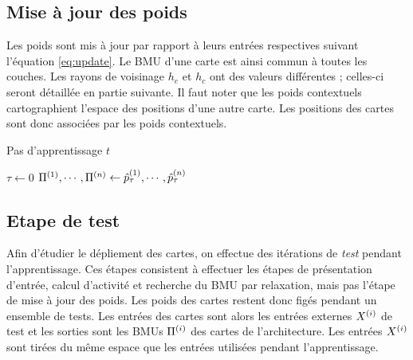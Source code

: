 \subsection{Mise à jour des poids}

Les poids sont mis à jour par rapport à leurs entrées respectives suivant l'équation \ref{eq:update}. Le BMU d'une carte est ainsi commun à toutes les couches. Les rayons de voisinage $h_e$ et $h_c$ ont des valeurs différentes ; celles-ci seront détaillée en partie suivante. 
Il faut noter que les poids contextuels cartographient l'espace des positions d'une autre carte. Les positions des cartes sont donc associées par les poids contextuels.
\begin{algorithm}\label{algo:cxsom}
\caption{Pas d'apprentissage $t$}
\SetAlgoLined
  $\tau \leftarrow 0$ \;
  $\Pi^{({1})}, \cdots, \Pi^{({n})} \leftarrow \hat{p}^{({1})}_\tau, \cdots , \hat{p}^{({n})}_\tau$ \;
 \end{algorithm}
\subsection{Etape de test}

Afin d'étudier le dépliement des cartes, on effectue des itérations de \emph{test} pendant l'apprentissage. Ces étapes consistent à effectuer les étapes de présentation d'entrée, calcul d'activité et recherche du BMU par relaxation, mais pas l'étape de mise à jour des poids. Les poids des cartes restent donc figés pendant un ensemble de tests. Les entrées des cartes sont alors les entrées externes $X^{({i})}$ de test et les sorties sont les BMUs $\Pi^{({i})}$ des cartes de l'architecture. 
Les entrées $X^{({i})}$ sont tirées du même espace que les entrées utilisées pendant l'apprentissage.

